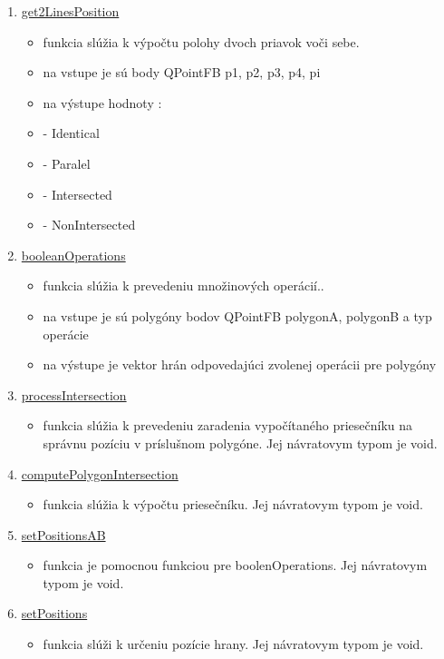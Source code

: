 \documentclass[12pt]{article}
\begin{document}
\begin{enumerate}
\item[] \underline{get2LinesPosition}
\begin{itemize}
\item funkcia slúžia k výpočtu polohy dvoch priavok voči sebe. 
\item na vstupe je sú body QPointFB p1, p2, p3, p4, pi
\item na výstupe hodnoty :
\item[] - Identical
\item[] - Paralel
\item[] - Intersected
\item[] - NonIntersected
\end{itemize}


\item[] \underline{booleanOperations}
\begin{itemize}
\item funkcia slúžia k prevedeniu množinových operácií.. 
\item na vstupe je sú polygóny bodov QPointFB polygonA, polygonB a typ operácie 
\item na výstupe je vektor hrán odpovedajúci zvolenej operácii pre polygóny
\end{itemize}


\item[] \underline{processIntersection}
\begin{itemize}
\item funkcia slúžia k prevedeniu zaradenia vypočítaného priesečníku na správnu pozíciu v príslušnom polygóne. Jej návratovym typom je void. 
\end{itemize}


\item[] \underline{computePolygonIntersection}
\begin{itemize}
\item funkcia slúžia k výpočtu priesečníku. Jej návratovym typom je void. 
\end{itemize}


\item[] \underline{setPositionsAB}
\begin{itemize}
\item funkcia je pomocnou funkciou pre boolenOperations. Jej návratovym typom je void. 
\end{itemize}


\item[] \underline{setPositions}
\begin{itemize}
\item funkcia slúži k určeniu pozície hrany. Jej návratovym typom je void. 
\end{itemize}



\end{enumerate}
\end{document}
